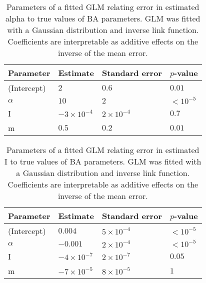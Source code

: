 \begin{table}[ht]
\centering
\begin{tabular}{llll}
  \hline
Parameter & Estimate & Standard error & $p$-value \\ 
  \hline
(Intercept) & $2$ & $0.6$ & $0.01$ \\ 
  $\alpha$ & $10$ & $2$ & ${<}10^{-5}$ \\ 
  I & $-3\!\times\!10^{-4}$ & $2\!\times\!10^{-4}$ & $0.7$ \\ 
  m & $0.5$ & $0.2$ & $0.01$ \\ 
   \hline
\end{tabular}
\caption[Parameters of a fitted \gls{GLM} relating error in estimated \gls{alpha} to true values of \gls{BA} parameters.]{Parameters of a fitted \gls{GLM} relating error in estimated \gls{alpha} to true values of \gls{BA} parameters. \gls{GLM} was fitted with a Gaussian distribution and inverse link function. Coefficients are interpretable as additive effects on the inverse of the mean error.} 
\label{tab:glmalpha}
\end{table}
\begin{table}[ht]
\centering
\begin{tabular}{llll}
  \hline
Parameter & Estimate & Standard error & $p$-value \\ 
  \hline
(Intercept) & $0.004$ & $5\!\times\!10^{-4}$ & ${<}10^{-5}$ \\ 
  $\alpha$ & $-0.001$ & $2\!\times\!10^{-4}$ & ${<}10^{-5}$ \\ 
  I & $-4\!\times\!10^{-7}$ & $2\!\times\!10^{-7}$ & $0.05$ \\ 
  m & $-7\!\times\!10^{-5}$ & $8\!\times\!10^{-5}$ & $1$ \\ 
   \hline
\end{tabular}
\caption[Parameters of a fitted \gls{GLM} relating error in estimated \gls{I} to true values of \gls{BA} parameters.]{Parameters of a fitted \gls{GLM} relating error in estimated \gls{I} to true values of \gls{BA} parameters. GLM was fitted with a Gaussian distribution and inverse link function. Coefficients are interpretable as additive effects on the inverse of the mean error.} 
\label{tab:glmI}
\end{table}



